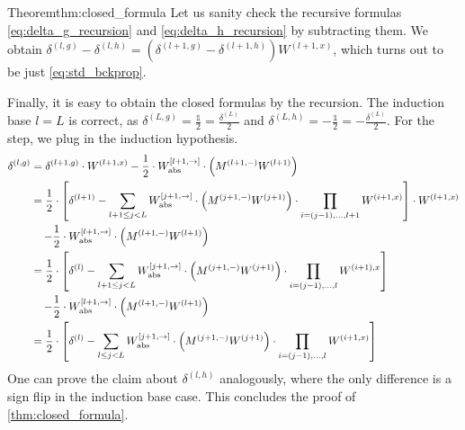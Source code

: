 \begin{proofref}{Theorem}{thm:closed_formula}
    Let us sanity check the recursive formulas \cref{eq:delta_g_recursion} and \cref{eq:delta_h_recursion} by subtracting them.
    We obtain $\delta^{(l, g)} - \delta^{(l, h)} = \left( \delta^{(l+1,g)} -\delta^{(l+1,h)} \right) W^{(l+1, x)}$, which turns out to be just \cref{eq:std_bckprop}.

    Finally, it is easy to obtain the closed formulas by the recursion.
    The induction base $l=L$ is correct, as $\delta^{(L,g)} = \frac{\mathbb{1}}{2} = \frac{\delta^{(L)}}{2}$ and $\delta^{(L,h)} = - \frac{\mathbb{1}}{2} = -\frac{\delta^{(L)}}{2}$.
    For the step, we plug in the induction hypothesis.
    \begin{align}
        \delta^{(l, g)}
            &= \delta^{(l+1, g)} \cdot W^{(l+1, x)} - \frac{1}{2} \cdot W_{\text{abs}}^{[l+1, \rightarrow]} \cdot \left( M^{(l+1,-)}W^{(l+1)} \right) \\
            &= \frac{1}{2} \cdot \left[ \delta^{(l+1)} - \sum_{l+1 \leq j < L} W_{\text{abs}}^{[j+1, \rightarrow]} \cdot \left( M^{(j+1,-)}W^{(j+1)} \right) \cdot \prod_{i = (j-1),\dots, l+1} W^{(i+1, x)} \right] \cdot W^{(l+1, x)}  \\ &\qquad \mathllap{-} \frac{1}{2} \cdot W_{\text{abs}}^{[l+1, \rightarrow]} \cdot \left( M^{(l+1, -)} W^{(l+1)} \right) \\
            &= \frac{1}{2} \cdot \left[ \delta^{(l)} - \sum_{l+1 \leq j < L} W_{\text{abs}}^{[j+1, \rightarrow]} \cdot \left( M^{(j+1,-)}W^{(j+1)} \right) \cdot \prod_{i = (j-1),\dots, l} W^{(i+1), x} \right] \\ &\qquad \mathllap{-} \frac{1}{2} \cdot W_{\text{abs}}^{[l+1, \rightarrow]} \cdot \left( M^{(l+1, -)} W^{(l+1)} \right) \\
            &= \frac{1}{2} \cdot \left[ \delta^{(l)} - \sum_{l \leq j < L} W_{\text{abs}}^{[j+1, \rightarrow]} \cdot \left( M^{(j+1,-)}W^{(j+1)} \right) \cdot \prod_{i = (j-1),\dots, l} W^{(i+1, x)} \right]
    \end{align}
    One can prove the claim about $\delta^{(l, h)}$ analogously, where the only difference is a sign flip in the induction base case.
    This concludes the proof of \cref{thm:closed_formula}.
\end{proofref}

